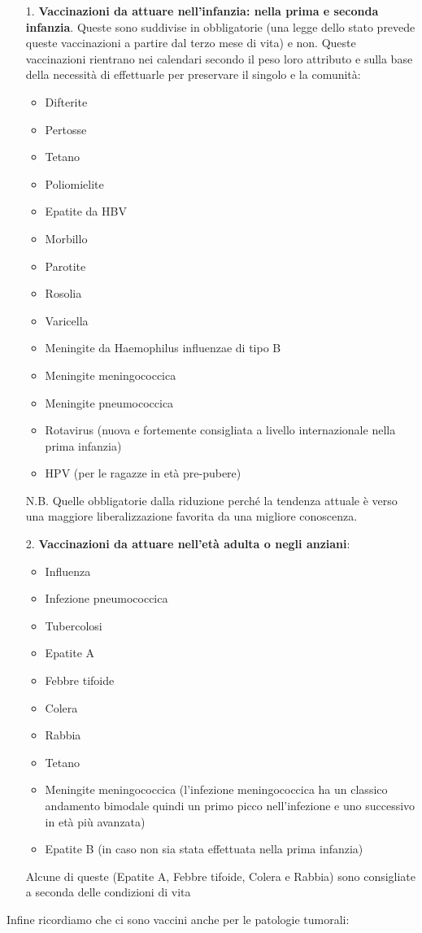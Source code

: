 \begin{itemize}

\item[1.]
  \textbf{Vaccinazioni da attuare nell'infanzia: nella prima e seconda
  infanzia}. Queste sono suddivise in obbligatorie (una legge dello
  stato prevede queste vaccinazioni a partire dal terzo mese di vita) e
  non. Queste vaccinazioni rientrano nei calendari secondo il peso loro
  attributo e sulla base della necessità di effettuarle per preservare
  il singolo e la comunità:

\begin{itemize}
\item
  Difterite
\item
  Pertosse
\item
  Tetano
\item
  Poliomielite
\item
  Epatite da HBV
\item
  Morbillo
\item
  Parotite
\item
  Rosolia
\item
  Varicella
\item
  Meningite da Haemophilus influenzae di tipo B
\item
  Meningite meningococcica
\item
  Meningite pneumococcica
\item
  Rotavirus (nuova e fortemente consigliata a livello internazionale
  nella prima infanzia)
\item
  HPV (per le ragazze in età pre-pubere)
\end{itemize}
  N.B. Quelle obbligatorie dalla riduzione perché la tendenza attuale è
  verso una maggiore liberalizzazione favorita da una migliore
  conoscenza.

\item[2.]
  \textbf{Vaccinazioni da attuare nell'età adulta o negli anziani}:

\begin{itemize}
\item
  Influenza
\item
  Infezione pneumococcica
\item
  Tubercolosi
\item
  Epatite A
\item
  Febbre tifoide
\item
  Colera
\item
  Rabbia
\item
  Tetano
\item
  Meningite meningococcica (l'infezione meningococcica ha un classico
  andamento bimodale quindi un primo picco nell'infezione e uno
  successivo in età più avanzata)
\item
  Epatite B (in caso non sia stata effettuata nella prima infanzia)
\end{itemize}
  Alcune di queste (Epatite A, Febbre tifoide, Colera e Rabbia) sono
  consigliate a seconda delle condizioni di vita
\end{itemize}
  Infine ricordiamo che ci sono vaccini anche per le patologie tumorali:

